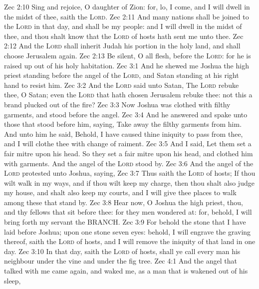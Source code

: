 \vs Zec 2:10 Sing and rejoice, O daughter of Zion: for, lo, I come, and I will dwell in the midst of thee, saith the \textsc{Lord}.
\vs Zec 2:11 And many nations shall be joined to the \textsc{Lord} in that day, and shall be my people: and I will dwell in the midst of thee, and thou shalt know that the \textsc{Lord} of hosts hath sent me unto thee.
\vs Zec 2:12 And the \textsc{Lord} shall inherit Judah his portion in the holy land, and shall choose Jerusalem again.
\vs Zec 2:13 Be silent, O all flesh, before the \textsc{Lord}: for he is raised up out of his holy habitation.
\vs Zec 3:1 And he shewed me Joshua the high priest standing before the angel of the \textsc{Lord}, and Satan standing at his right hand to resist him.
\vs Zec 3:2 And the \textsc{Lord} said unto Satan, The \textsc{Lord} rebuke thee, O Satan; even the \textsc{Lord} that hath chosen Jerusalem rebuke thee:  not this a brand plucked out of the fire?
\vs Zec 3:3 Now Joshua was clothed with filthy garments, and stood before the angel.
\vs Zec 3:4 And he answered and spake unto those that stood before him, saying, Take away the filthy garments from him. And unto him he said, Behold, I have caused thine iniquity to pass from thee, and I will clothe thee with change of raiment.
\vs Zec 3:5 And I said, Let them set a fair mitre upon his head. So they set a fair mitre upon his head, and clothed him with garments. And the angel of the \textsc{Lord} stood by.
\vs Zec 3:6 And the angel of the \textsc{Lord} protested unto Joshua, saying,
\vs Zec 3:7 Thus saith the \textsc{Lord} of hosts; If thou wilt walk in my ways, and if thou wilt keep my charge, then thou shalt also judge my house, and shalt also keep my courts, and I will give thee places to walk among these that stand by.
\vs Zec 3:8 Hear now, O Joshua the high priest, thou, and thy fellows that sit before thee: for they  men wondered at: for, behold, I will bring forth my servant the BRANCH.
\vs Zec 3:9 For behold the stone that I have laid before Joshua; upon one stone  seven eyes: behold, I will engrave the graving thereof, saith the \textsc{Lord} of hosts, and I will remove the iniquity of that land in one day.
\vs Zec 3:10 In that day, saith the \textsc{Lord} of hosts, shall ye call every man his neighbour under the vine and under the fig tree.
\vs Zec 4:1 And the angel that talked with me came again, and waked me, as a man that is wakened out of his sleep,
